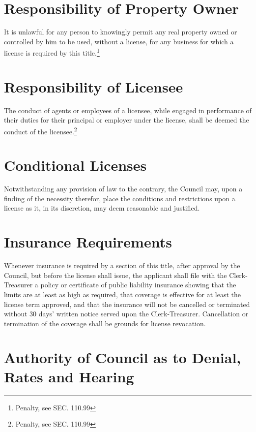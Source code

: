 \section{Responsibility of Property Owner}
It is unlawful for any person to knowingly permit any real property owned or controlled by him to be used, without a license, for any business for which a license is required by this title.\footnote{Penalty, see SEC. 110.99}

\section{Responsibility of Licensee}
The conduct of agents or employees of a licensee, while engaged in performance of their duties for their principal or employer under the license, shall be deemed the conduct of the licensee.\footnote{Penalty, see SEC. 110.99}

\section{Conditional Licenses}
Notwithstanding any provision of law to the contrary, the Council may, upon a finding of the necessity therefor, place the conditions and restrictions upon a license as it, in its discretion, may deem reasonable and justified.

\section{Insurance Requirements}
Whenever insurance is required by a section of this title, after approval by the Council, but before the license shall issue, the applicant shall file with the Clerk-Treasurer a policy or certificate of public liability insurance showing that the limits are at least as high as required, that coverage is effective for at least the license term approved, and that the insurance will not be cancelled or terminated without 30 days’ written notice served upon the Clerk-Treasurer.  Cancellation or termination of the coverage shall be grounds for license revocation.

\section{Authority of Council as to Denial, Rates and Hearing}
